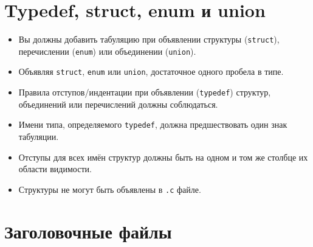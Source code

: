\documentclass{42-ru}
\begin{document}
    \newpage


    \section{Typedef, struct, enum и union}

        \begin{itemize}

            \item Вы должны добавить табуляцию при объявлении структуры (\texttt{struct}), перечислении (\texttt{enum}) или объединении (\texttt{union}).

            \item Объявляя \texttt{struct}, \texttt{enum} или \texttt{union}, достаточное одного пробела в типе.

            \item Правила отступов/индентации при объявлении (\texttt{typedef}) структур, объединений или перечислений должны соблюдаться.

            \item Имени типа, определяемого \texttt{typedef}, должна предшествовать один знак табуляции.

            \item Отступы для всех имён структур должны быть на одном и том же столбце их области видимости.

            \item Структуры не могут быть объявлены в \texttt{.c} файле.

        \end{itemize}

    \newpage


    \section{Заголовочные файлы}
\end{document}
